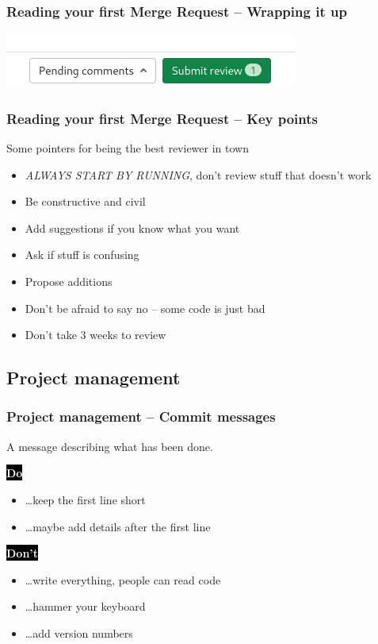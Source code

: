 \documentclass{beamer}
\newcommand{\keyword}[1]{\hspace{-1.0em}\colorbox{black}{\textcolor{white}{\textbf{#1}\vphantom{Ep}}}\vspace{0.2em}} %
\begin{document}
\begin{frame}[fragile]
  \frametitle{Reading your first Merge Request -- Wrapping it up}
  \includegraphics[width=\linewidth]{gitlab-first-review/10-submit.png}
\end{frame}

\begin{frame}[fragile]
  \frametitle{Reading your first Merge Request -- Key points}

  Some pointers for being the best reviewer in town
  \begin{itemize}[<+->]
    \item \emph{ALWAYS START BY RUNNING}, don't review stuff that doesn't work
    \item Be constructive and civil
    \item Add suggestions if you know what you want
    \item Ask if stuff is confusing
    \item Propose additions
    \item Don't be afraid to say no -- some code is just bad
    \item Don't take 3 weeks to review
  \end{itemize}
\end{frame}

\subsection{Project management}

\begin{frame}[fragile]
  \frametitle{Project management -- Commit messages}
  \vspace{1em}

  A message describing what has been done.
  \vspace{1em}

  \keyword{Do}
  \begin{itemize}
    \item \dots keep the first line short
    \item \dots maybe add details after the first line
  \end{itemize}
  \vspace{1em}

  \pause

  \keyword{Don't}
  \begin{itemize}
    \item \dots write everything, people can read code
    \item \dots hammer your keyboard
    \item \dots add version numbers
  \end{itemize}
  \vspace{1em}

\end{frame}
\end{document}
